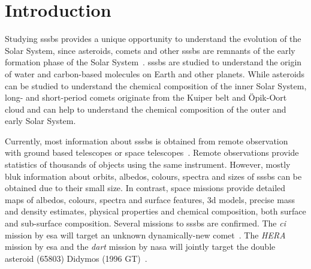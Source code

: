 \section{Introduction} \label{sec:introduction}




Studying \glspl{sssb} provides a unique opportunity to understand the evolution of the Solar System, since asteroids, comets and other \glspl{sssb} are remnants of the early formation phase of the Solar System~\cite{walsh2018rubble, a2017comets}. \glspl{sssb} are studied to understand the origin of water and carbon-based molecules on Earth and other planets. While asteroids can be studied to understand the chemical composition of the inner Solar System, long- and short-period comets originate from the Kuiper belt and \"Opik-Oort cloud and can help to understand the chemical composition of the outer and early Solar System.

Currently, most information about \glspl{sssb} is obtained from remote observation with ground based telescopes or space telescopes~\cite{bowles2018castaway}. Remote observations provide statistics of thousands of objects using the same instrument. However, mostly bluk information about orbits, albedos, colours, spectra and sizes of \glspl{sssb} can be obtained due to their small size. In contrast, space missions provide detailed maps of albedos, colours, spectra and surface features, \gls{3d} models, precise mass and density estimates, physical properties and chemical composition, both surface and sub-surface composition. Several missions to \glspl{sssb} are confirmed. The \textit{\gls{ci}} mission by \gls{esa} will target an unknown dynamically-new comet~\cite{snodgrass2019europeanCI}. The \textit{HERA} mission by \gls{esa} and the \textit{\gls{dart}} mission by \gls{nasa} will jointly target the double asteroid (65803) Didymos (1996 GT)~\cite{hera, talbert_2017DART}.

